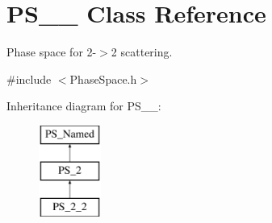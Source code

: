 \hypertarget{classPS__2__2}{}\section{P\+S\+\_\+\_ Class Reference}
\label{classPS__2__2}


Phase space for 2-\/$>$2 scattering.  




{\ttfamily \#include $<$Phase\+Space.\+h$>$}

Inheritance diagram for P\+S\+\_\+\_\+:\begin{figure}[H]
\begin{center}
\leavevmode
\includegraphics[height=3.000000cm]{classPS__2__2}
\end{center}
\end{figure}
